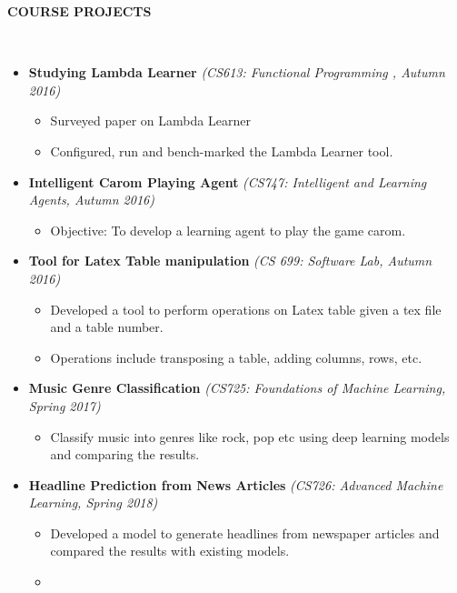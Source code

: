\documentclass[a4paper,10pt]{article}
\newcommand{\isep}{-2 pt}
\newcommand{\lsep}{-0.5cm}
\newcommand{\resheading}[1]{{\small \colorbox{mygrey}{\begin{minipage}{0.975\textwidth}{\textbf{#1 \vphantom{p\^{E}}}}\end{minipage}}}}
\begin{document}
\resheading{\textbf{COURSE PROJECTS} }\\[\lsep]
\begin{itemize}
\itemsep \isep
	\item \textbf{Studying Lambda Learner} \hfill\emph{(CS613: Functional Programming , Autumn 2016)}\\[-0.4cm]
	\begin{itemize}\itemsep \isep
		\item Surveyed paper on Lambda Learner
		\item Configured, run and bench-marked the Lambda Learner tool.
	\end{itemize}
	
	
	\item \textbf{Intelligent Carom Playing Agent} \hfill\emph{(CS747: Intelligent and Learning Agents, Autumn 2016)}\\[-0.6cm]
	\begin{itemize}\itemsep \isep
		\item Objective: To develop a learning agent to play the game carom.
	\end{itemize}	
	
	\item \textbf{Tool for Latex Table manipulation} \hfill\emph{(CS 699: Software Lab, Autumn 2016)}\\[-0.4cm]
	\begin{itemize}\itemsep \isep
	    \item Developed a tool to perform operations on Latex table given a tex file and a table number.
	    \item Operations include transposing a table, adding columns, rows, etc.
	\end{itemize}

	\item \textbf{Music Genre Classification} \hfill\emph{(CS725: Foundations of Machine Learning, Spring 2017)}\\[-0.4cm]
	\begin{itemize}\itemsep \isep
	    \item Classify music into genres like rock, pop etc using deep learning models and comparing the results.
	\end{itemize}

	\item \textbf{Headline Prediction from News Articles} \hfill\emph{(CS726: Advanced Machine Learning, Spring 2018)}\\[-0.4cm]
	\begin{itemize}\itemsep \isep
	    \item Developed a model to generate headlines from newspaper articles and compared the results with existing models.
	    \item 

	\end{itemize}
	

\end{itemize}
\end{document}

